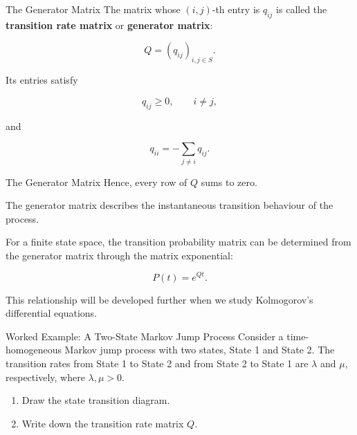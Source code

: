 \documentclass[
  ignorenonframetext,
  aspectratio=169,
]{beamer}
\providecommand{\tightlist}{%
  \setlength{\itemsep}{0pt}\setlength{\parskip}{0pt}}
\begin{document}
\begin{frame}{The Generator Matrix}
\protect{}\label{the-generator-matrix}
The matrix whose \((i,j)\)-th entry is \(q_{ij}\) is called the
\textbf{transition rate matrix} or \textbf{generator matrix}:

\[
Q=(q_{ij})_{i,j\in S}.
\]

Its entries satisfy

\[
q_{ij}\geq 0,\qquad i\neq j,
\]

and

\[
q_{ii}=-\sum_{j\neq i}q_{ij}.
\]
\end{frame}

\begin{frame}{The Generator Matrix}
\protect{}\label{the-generator-matrix-1}
Hence, every row of \(Q\) sums to zero.

The generator matrix describes the instantaneous transition behaviour of
the process.

For a finite state space, the transition probability matrix can be
determined from the generator matrix through the matrix exponential:

\[
\boxed{
P(t)=e^{Qt}.
}
\]

This relationship will be developed further when we study Kolmogorov's
differential equations.
\end{frame}

\begin{frame}{Worked Example: A Two-State Markov Jump Process}
\protect{}\label{worked-example-a-two-state-markov-jump-process}
Consider a time-homogeneous Markov jump process with two states, State 1
and State 2. The transition rates from State 1 to State 2 and from State
2 to State 1 are \(\lambda\) and \(\mu\), respectively, where
\(\lambda,\mu>0\).

\begin{enumerate}
\tightlist
\item
  Draw the state transition diagram.
\item
  Write down the transition rate matrix \(Q\).
\end{enumerate}
\end{frame}
\end{document}
